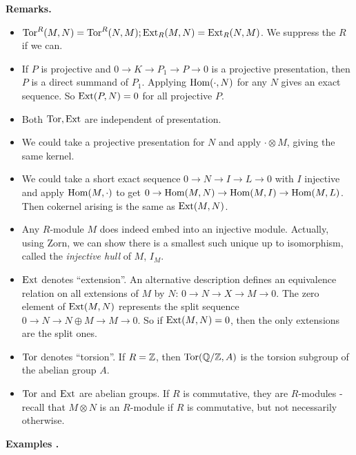 \documentclass[10pt,a4paper]{article}
\begin{document}
\textbf{Remarks.}
\begin{itemize}
  \item $\operatorname{Tor}^R(M,N) = \operatorname{Tor}^R(N,M); \operatorname{Ext}_R(M,N) = \operatorname{Ext}_R(N,M)$. We suppress the $R$ if we can.
  \item If $P$ is projective and $0 \to K \to P_1 \to P \to 0$ is a projective presentation, then $P$ is a direct summand of $P_1$. Applying $\operatorname{Hom}(\cdot, N)$ for any $N$ gives an exact sequence. So $\operatorname{Ext}(P, N) = 0$ for all projective $P$.
  \item Both $\operatorname{Tor}, \operatorname{Ext}$ are independent of presentation.
  \item We could take a projective presentation for $N$ and apply $\cdot \otimes M$, giving the same kernel.
  \item We could take a short exact sequence $0 \to N \to I \to L\to 0$ with $I$ injective and apply $\operatorname{Hom}(M, \cdot)$ to get $0 \to \operatorname{Hom}(M,N) \to \operatorname{Hom}(M,I) \to \operatorname{Hom}(M,L)$. Then cokernel arising is the same as $\operatorname{Ext}(M,N)$.
  \item Any $R$-module $M$ does indeed embed into an injective module. Actually, using Zorn, we can show there is a smallest such unique up to isomorphism, called the \emph{injective hull} of $M$, $I_M$.
  \item $\operatorname{Ext}$ denotes ``extension''. An alternative description defines an equivalence relation on all extensions of $M$ by $N$: $0 \to N \to X \to M\to 0$. The zero element of $\operatorname{Ext}(M,N)$ represents the split sequence $0 \to N \to N \oplus M \to M \to 0$. So if $\operatorname{Ext}(M,N) = 0$, then the only extensions are the split ones.
  \item $\operatorname{Tor}$ denotes ``torsion''. If $R = \mathbb{Z}$, then $\operatorname{Tor}(\mathbb{Q}/\mathbb{Z}, A)$ is the torsion subgroup of the abelian group $A$.
  \item $\operatorname{Tor}$ and $\operatorname{Ext}$ are abelian groups. If $R$ is commutative, they are $R$-modules - recall that $M \otimes N$ is an $R$-module if $R$ is commutative, but not necessarily otherwise.
\end{itemize}
\textbf{Examples \thetheorem.}
\end{document}
